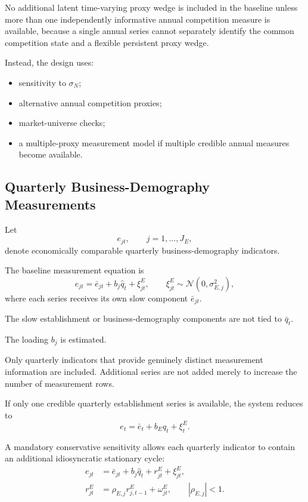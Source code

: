 \documentclass[11pt]{article}
\newcommand{\Normal}{\mathcal{N}}
\begin{document}
No additional latent time-varying proxy wedge is included in the baseline unless more than one independently informative annual competition measure is available, because a single annual series cannot separately identify the common competition state and a flexible persistent proxy wedge.

Instead, the design uses:
\begin{itemize}
\item sensitivity to \(\sigma_N\);
\item alternative annual competition proxies;
\item market-universe checks;
\item a multiple-proxy measurement model if multiple credible annual measures become available.
\end{itemize}

\subsection{Quarterly Business-Demography Measurements}

Let
\begin{equation}
e_{jt},
\qquad j=1,\ldots,J_E,
\end{equation}
denote economically comparable quarterly business-demography indicators.

The baseline measurement equation is
\begin{equation}
e_{jt}
=
\bar e_{jt}
+
b_j\hat q_t
+
\xi_{jt}^E,
\qquad
\xi_{jt}^E\sim\Normal(0,\sigma_{E,j}^2),
\label{eq:quarterly_measurement}
\end{equation}
where each series receives its own slow component \(\bar e_{jt}\).

The slow establishment or business-demography components are not tied to \(\bar q_t\).

The loading \(b_j\) is estimated.

Only quarterly indicators that provide genuinely distinct measurement information are included. Additional series are not added merely to increase the number of measurement rows.

If only one credible quarterly establishment series is available, the system reduces to
\begin{equation}
e_t
=
\bar e_t+b_E\hat q_t+\xi_t^E.
\end{equation}

A mandatory conservative sensitivity allows each quarterly indicator to contain an additional idiosyncratic stationary cycle:
\begin{align}
e_{jt}
&=
\bar e_{jt}
+
b_j\hat q_t
+
r_{jt}^E
+
\xi_{jt}^E,\\
r_{jt}^E
&=
\rho_{E,j}r_{j,t-1}^E+\omega_{jt}^E,
\qquad |\rho_{E,j}|<1.
\end{align}
\end{document}
